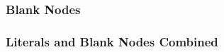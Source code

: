 \subsubsection{Blank Nodes}

\subsubsection{Literals and Blank Nodes Combined}






























